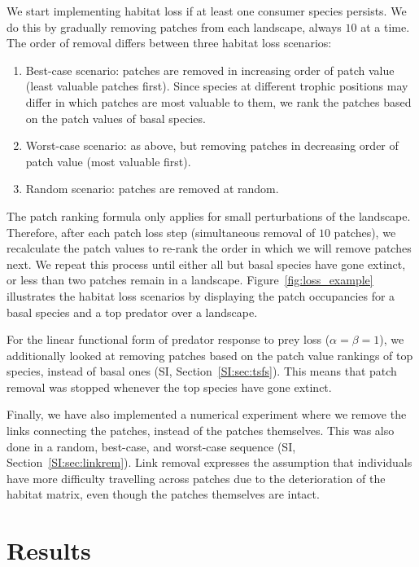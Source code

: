 \documentclass[11pt]{article}
\newcommand{\SI}{SI}
\begin{document}
We start implementing habitat loss if at least one consumer species persists. We do this by gradually removing patches from each landscape, always $10$ at a time. The order of removal differs between three habitat loss scenarios:
\begin{enumerate}
\item Best-case scenario: patches are removed in increasing order of patch value (least valuable patches first). Since species at different trophic positions may differ in which patches are most valuable to them, we rank the patches based on the patch values of basal species.
\item Worst-case scenario: as above, but removing patches in decreasing order of patch value (most valuable first).
\item Random scenario: patches are removed at random.
\end{enumerate}
The patch ranking formula only applies for small perturbations of the landscape. Therefore, after each patch loss step (simultaneous removal of $10$ patches), we recalculate the patch values to re-rank the order in which we will remove patches next. We repeat this process until either all but basal species have gone extinct, or less than two patches remain in a landscape. Figure~\ref{fig:loss_example} illustrates the habitat loss scenarios by displaying the patch occupancies for a basal species and a top predator over a landscape.

For the linear functional form of predator response to prey loss ($\alpha = \beta = 1$), we additionally looked at removing patches based on the patch value rankings of top species, instead of basal ones (\SI, Section~\ref{SI:sec:tsfs}). This means that patch removal was stopped whenever the top species have gone extinct.

Finally, we have also implemented a numerical experiment where we remove the links connecting the patches, instead of the patches themselves. This was also done in a random, best-case, and worst-case sequence (\SI, Section~\ref{SI:sec:linkrem}). Link removal expresses the assumption that individuals have more difficulty travelling across patches due to the deterioration of the habitat matrix, even though the patches themselves are intact.


\section{Results} \label{sec:results}
\end{document}

